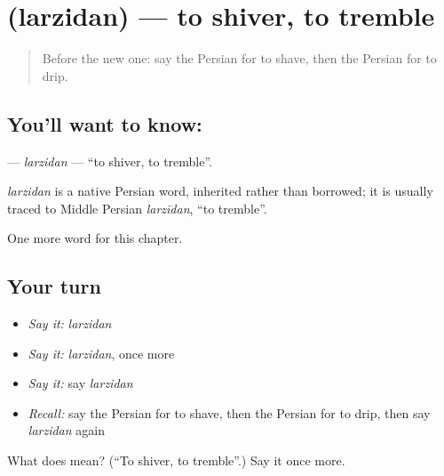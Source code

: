 \section[\texorpdfstring{\fa{لرزیدن} (larzidan)}{لرزیدن (larzidan)}]{ (larzidan) — to shiver, to tremble}

\label{lesson:FA-C186-larzidan}



\begin{quote}
Before the new one: say the Persian for to shave, then the Persian for to drip.
\end{quote}

\subsection*{You'll want to know: }
\textbf{} — \emph{larzidan} — \textquotedblleft{}to shiver, to tremble\textquotedblright{}.

\begin{cousinweb}
\emph{larzidan} is a native Persian word, inherited rather than borrowed; it is usually traced to Middle Persian \emph{larzīdan}, \textquotedblleft{}to tremble\textquotedblright{}.
\end{cousinweb}

\begin{grammarlens}[title={What you've built}]
One more word for this chapter.
\end{grammarlens}

\subsection*{Your turn}
\begin{itemize}
\raggedright
  \item \emph{Say it:} \emph{larzidan}
  \item \emph{Say it:} \emph{larzidan}, once more
  \item \emph{Say it:} say \emph{larzidan}
  \item \emph{Recall:} say the Persian for to shave, then the Persian for to drip, then say \emph{larzidan} again
\end{itemize}

\begin{tcolorbox}[breakable,colback=teal!4,colframe=teal!35!black,title={Before you move on}]
What does  mean? (\textquotedblleft{}To shiver, to tremble\textquotedblright{}.) Say it once more.
\end{tcolorbox}
